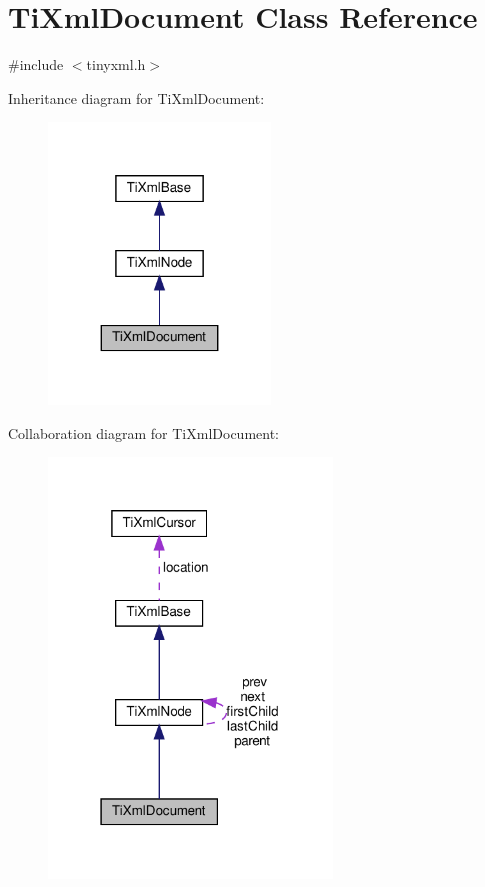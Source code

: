 \hypertarget{classTiXmlDocument}{}\section{Ti\+Xml\+Document Class Reference}
\label{classTiXmlDocument}


{\ttfamily \#include $<$tinyxml.\+h$>$}



Inheritance diagram for Ti\+Xml\+Document\+:
\nopagebreak
\begin{figure}[H]
\begin{center}
\leavevmode
\includegraphics[width=167pt]{classTiXmlDocument__inherit__graph}
\end{center}
\end{figure}


Collaboration diagram for Ti\+Xml\+Document\+:
\nopagebreak
\begin{figure}[H]
\begin{center}
\leavevmode
\includegraphics[width=214pt]{classTiXmlDocument__coll__graph}
\end{center}
\end{figure}
